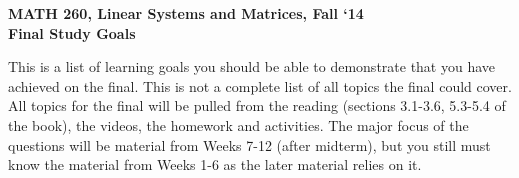 \documentclass{article}
\begin{document}
\begin{flushleft}
	\bfseries{MATH 260, Linear Systems and Matrices, Fall `14}\\
	\bfseries{Final Study Goals}\\
\end{flushleft}
\begin{flushleft}
This is a list of learning goals you should be able to demonstrate that you have achieved on the final.  This is not a complete list of all topics the final could cover.  All topics for the final will be pulled from the reading (sections 3.1-3.6, 5.3-5.4 of the book), the videos, the homework and  activities.  The major focus of the questions will be material from Weeks 7-12 (after midterm), but you still must know the material from Weeks 1-6 as the later material relies on it.

\vspace{0.2in}


\end{flushleft}
\end{document}
